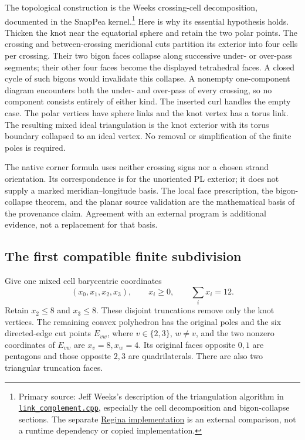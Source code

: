 The topological construction is the Weeks crossing-cell decomposition,
documented in the SnapPea kernel.\footnote{Primary source: Jeff Weeks's
description of the triangulation algorithm in
\href{https://github.com/regina-normal/regina/blob/e3a5c7c0e0581706d9e5531b750160b322489950/engine/snappea/kernel/link_complement.cpp}{\texttt{link\_complement.cpp}},
especially the cell decomposition and bigon-collapse sections. The separate
\href{https://github.com/regina-normal/regina/blob/e3a5c7c0e0581706d9e5531b750160b322489950/engine/link/complement.cpp}{Regina implementation}
is an external comparison, not a runtime dependency or copied implementation.}
Here is why its essential hypothesis holds. Thicken the knot near the
equatorial sphere and retain the two polar points. The crossing and
between-crossing meridional cuts partition its exterior into four cells per
crossing. Their two bigon faces collapse along successive under- or over-pass
segments; their other four faces become the displayed tetrahedral faces.
A closed cycle of such bigons would invalidate this collapse. A nonempty
one-component diagram encounters both the under- and over-pass of every
crossing, so no component consists entirely of either kind. The inserted
curl handles the empty case. The polar vertices have sphere links and the
knot vertex has a torus link. The resulting mixed ideal triangulation is
the knot exterior with its torus boundary collapsed to an ideal vertex.
No removal or simplification of the finite poles is required.

The native corner formula uses neither crossing signs nor a chosen strand
orientation. Its correspondence is for the unoriented PL exterior; it does
not supply a marked meridian--longitude basis. The local face prescription,
the bigon-collapse theorem, and the planar source validation are the
mathematical basis of the provenance claim. Agreement with an external
program is additional evidence, not a replacement for that basis.

\subsection{The first compatible finite subdivision}

Give one mixed cell barycentric coordinates
\[
 (x_0,x_1,x_2,x_3),\qquad x_i\ge0,\qquad\sum_i x_i=12.
\]
Retain $x_2\le8$ and $x_3\le8$. These disjoint truncations remove only the
knot vertices. The remaining convex polyhedron has the original poles and
the six directed-edge cut points $E_{vw}$, where $v\in\{2,3\}$, $w\ne v$,
and the two nonzero coordinates of $E_{vw}$ are $x_v=8,x_w=4$.
Its original faces opposite $0,1$ are pentagons and those opposite $2,3$
are quadrilaterals. There are also two triangular truncation faces.

